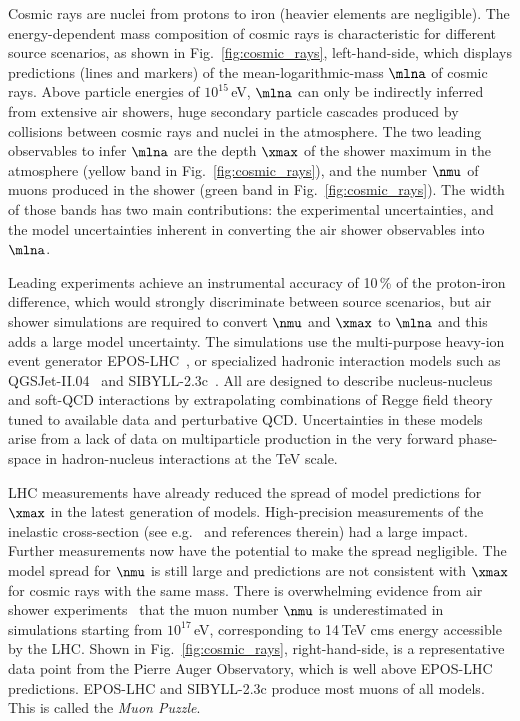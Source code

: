 \documentclass[../report.tex]{subfiles}
\begin{document}
Cosmic rays are nuclei from protons to iron (heavier elements are negligible). The energy-dependent mass composition of cosmic rays is characteristic for different source scenarios, as shown in Fig.~\ref{fig:cosmic_rays}, left-hand-side, which displays predictions (lines and markers) of the mean-logarithmic-mass $\mlna$ of cosmic rays. Above particle energies of $10^{15}$\,\si{eV}, $\mlna$ can only be indirectly inferred from extensive air showers, huge secondary particle cascades produced by collisions between cosmic rays and nuclei in the atmosphere. The two leading observables to infer $\mlna$ are the depth $\xmax$ of the shower maximum in the atmosphere (yellow band in Fig.~\ref{fig:cosmic_rays}), and the number $\nmu$ of muons produced in the shower (green band in Fig.~\ref{fig:cosmic_rays}). The width of those bands has two main contributions: the experimental uncertainties, and the model uncertainties inherent in converting the air shower observables into $\mlna$.

Leading experiments achieve an instrumental accuracy of 10\,\% of the proton-iron difference, which would strongly discriminate between source scenarios, but air shower simulations are required to convert $\nmu$ and $\xmax$ to $\mlna$ and this adds a large model uncertainty. The simulations use the multi-purpose heavy-ion event generator EPOS-LHC~\cite{Werner:2005jf}, or specialized hadronic interaction models such as \mbox{QGSJet-II.04}~\cite{Ostapchenko:2010vb} and SIBYLL-2.3c~\cite{Riehn:2017mfm}. All are designed to describe nucleus-nucleus and soft-QCD interactions by extrapolating combinations of Regge field theory tuned to available data and perturbative QCD. Uncertainties in these models arise from a lack of data on multiparticle production in the very forward phase-space in hadron-nucleus interactions at the TeV scale.

LHC measurements have already reduced the spread of model predictions for $\xmax$ in the latest generation of models. High-precision measurements of the inelastic cross-section (see e.g.~\cite{Aaij:2018okq} and references therein) had a large impact. Further measurements now have the potential to make the spread negligible. The model spread for $\nmu$ is still large and predictions are not consistent with $\xmax$ for cosmic rays with the same mass. There is overwhelming evidence from air shower experiments~\cite{Dembinski:2018UHECR,Aab:2014pza,Dembinski:2017zkb,Kokoulin:2009zz,Abbasi:2018fkz} that the muon number $\nmu$ is underestimated in simulations starting from $10^{17}$\,eV, corresponding to 14\,TeV cms energy accessible by the LHC. Shown in Fig.~\ref{fig:cosmic_rays}, right-hand-side, is a representative data point from the Pierre Auger Observatory, which is well above EPOS-LHC predictions. EPOS-LHC and SIBYLL-2.3c produce most muons of all models. This is called the \emph{Muon Puzzle}.
\end{document}
